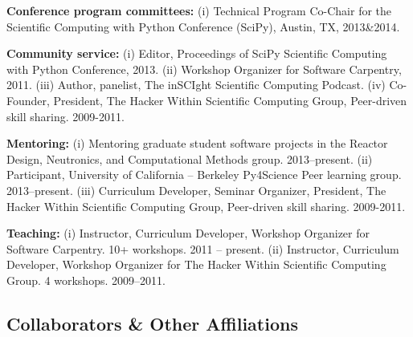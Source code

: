 \documentclass[svgnames,11pt]{article}
\begin{document}
\begin{bibenum}[itemsep=4pt]

    \item \textbf{Conference program committees:}
        (i) Technical Program Co-Chair for the Scientific Computing with Python 
        Conference (SciPy), Austin, TX, 2013\&2014.

    \item \textbf{Community service:}
        (i) Editor, Proceedings of SciPy Scientific Computing with Python 
        Conference, 2013.
        (ii) Workshop Organizer for Software Carpentry, 2011.
        (iii) Author, panelist, The inSCIght Scientific Computing Podcast.
        (iv) Co-Founder, President, The Hacker Within Scientific Computing Group, 
        Peer-driven skill sharing. 2009-2011.

    \item \textbf{Mentoring:}
        (i) Mentoring graduate student software projects in the Reactor Design, 
        Neutronics, and Computational Methods group. 2013--present.  
        (ii) Participant, University of California -- Berkeley Py4Science Peer 
        learning group. 2013--present. 
        (iii) Curriculum Developer, Seminar Organizer, President, The Hacker 
        Within Scientific Computing Group, Peer-driven skill sharing. 2009-2011.

    \item \textbf{Teaching:}
        (i) Instructor, Curriculum Developer, Workshop Organizer for 
        Software Carpentry. 10+ workshops. 2011 -- present.
        (ii) Instructor, Curriculum Developer, Workshop Organizer for 
        The Hacker Within Scientific Computing Group. 4 workshops. 2009--2011.


\end{bibenum}

\subsection{Collaborators \& Other Affiliations}
\end{document}
